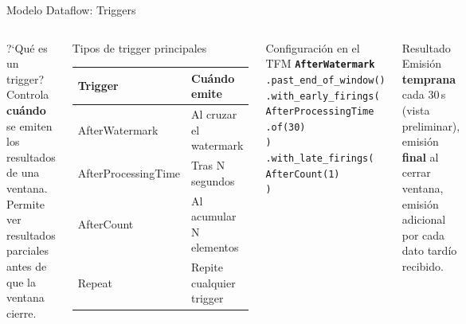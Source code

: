 \documentclass[aspectratio=169, 10pt]{beamer}
\begin{document}
\begin{frame}{Modelo Dataflow: Triggers}
  \begin{columns}[c]
      \begin{block}{?`Qu\'e es un trigger?}
        \small
        Controla \textbf{cu\'ando} se emiten los resultados de una ventana.
        Permite ver resultados parciales antes de que la ventana cierre.
      \end{block}
      \vspace{6pt}
      \begin{block}{Tipos de trigger principales}
      \renewcommand{\arraystretch}{1.3}
      \begin{tabular}{>{\small}l >{\small}p{3.2cm}}
        \toprule
        \textbf{Trigger} & \textbf{Cu\'ando emite} \\
        \midrule
        AfterWatermark & Al cruzar el watermark \\
        AfterProcessingTime & Tras N segundos \\
        AfterCount & Al acumular N elementos \\
        Repeat & Repite cualquier trigger \\
        \bottomrule
      \end{tabular}
      \end{block}
      \begin{exampleblock}{Configuraci\'on en el TFM}
        \footnotesize
        \texttt{\textbf{AfterWatermark}}\\
        \hspace{8pt}\texttt{.past\_end\_of\_window()}\\
        \hspace{4pt}\texttt{.with\_early\_firings(}\\
        \hspace{8pt}\texttt{AfterProcessingTime}\\
        \hspace{10pt}\texttt{.of(30)}\\
        \hspace{4pt}\texttt{)}\\
        \hspace{4pt}\texttt{.with\_late\_firings(}\\
        \hspace{8pt}\texttt{AfterCount(1)}\\
        \hspace{4pt}\texttt{)}
      \end{exampleblock}
      \vspace{6pt}
      \begin{alertblock}{\small Resultado}
        \small
        Emisi\'on \textbf{temprana} cada 30\,s (vista preliminar),
        emisi\'on \textbf{final} al cerrar ventana,
        emisi\'on adicional por cada dato tard\'io recibido.
      \end{alertblock}
  \end{columns}
\end{frame}
\end{document}
